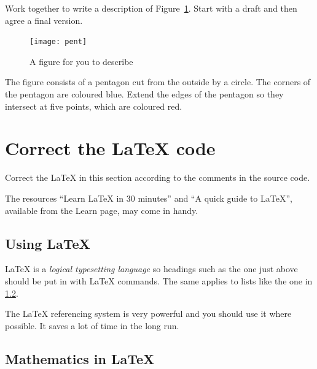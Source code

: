 \documentclass{UoESoMworkshop}
\begin{document}
\begin{exercise}[15 min]
Work together to write a description of Figure~\ref{fig:d7}. Start with a draft and then agree a final version. 
\end{exercise}

\begin{figure}[h]
    \centering
    \texttt{[image: pent]}
    \caption{A figure for you to describe}
    \label{fig:d7}
\end{figure}

The figure consists of a pentagon cut from the outside by a circle. The corners of the pentagon are coloured blue. Extend the edges of the pentagon so they intersect at five points, which are coloured red.


\section{Correct the \LaTeX{} code}

\begin{exercise}[15 min]
Correct the LaTeX in this section according to the comments in the source code.

The resources ``Learn LaTeX in 30 minutes'' and ``A quick guide to LaTeX'',
available from the Learn page, may come in handy.
\end{exercise}

\subsection{Using LaTeX}   %

\LaTeX{} is a \emph{logical typesetting language} %
so headings such as the one just above should be put in with LaTeX commands. The same applies to lists like the one 
in \ref{math_in_latex}.   %

The LaTeX referencing system is very powerful and you should use it where possible. It saves a lot of time in the long run. 


\subsection{Mathematics in \LaTeX{}}\label{math_in_latex}  %
\end{document}
